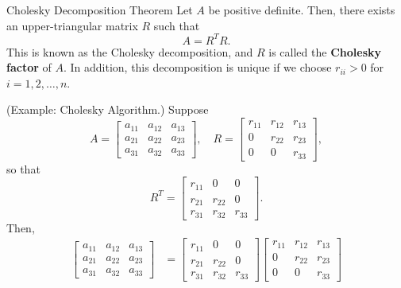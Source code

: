 \documentclass[letterpaper]{article}
\newcommand{\0}{\mathbf{0}}
\begin{document}
\begin{theorem}{Cholesky Decomposition Theorem}{}
    Let $A$ be positive definite. Then, there exists an upper-triangular matrix $R$ such that \[A = R^T R.\] This is known as the Cholesky decomposition, and $R$ is called the \textbf{Cholesky factor} of $A$. In addition, this decomposition is unique if we choose $r_{ii} > 0$ for $i = 1, 2, \hdots, n$. 
\end{theorem}

\begin{mdframed}
    (Example: Cholesky Algorithm.) Suppose \[A = \begin{bmatrix}
        a_{11} & a_{12} & a_{13} \\ 
        a_{21} & a_{22} & a_{23} \\ 
        a_{31} & a_{32} & a_{33}
    \end{bmatrix}, \quad R = \begin{bmatrix}
        r_{11} & r_{12} & r_{13} \\ 
        0 & r_{22} & r_{23} \\ 
        0 & 0 & r_{33}
    \end{bmatrix},\]
    so that \[R^T = \begin{bmatrix}
        r_{11} & 0 & 0 \\ 
        r_{21} & r_{22} & 0 \\ 
        r_{31} & r_{32} & r_{33}
    \end{bmatrix}.\] Then, 
    \begin{equation*}
        \begin{aligned}
            \begin{bmatrix}
                a_{11} & a_{12} & a_{13} \\ 
                a_{21} & a_{22} & a_{23} \\ 
                a_{31} & a_{32} & a_{33}
            \end{bmatrix} &= \begin{bmatrix}
                r_{11} & 0 & 0 \\ 
                r_{21} & r_{22} & 0 \\ 
                r_{31} & r_{32} & r_{33}
            \end{bmatrix} \begin{bmatrix}
                r_{11} & r_{12} & r_{13} \\ 
                0 & r_{22} & r_{23} \\ 
                0 & 0 & r_{33}
            \end{bmatrix} \\ 

\end{aligned}
\end{equation*}
\end{mdframed}
\end{document}
